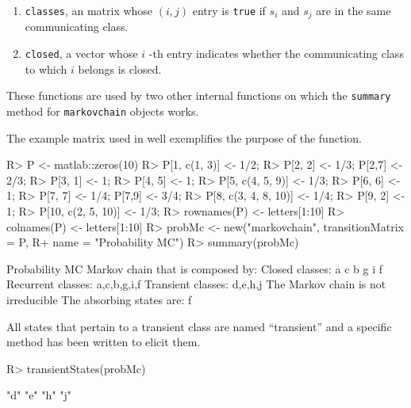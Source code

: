 \documentclass[
  nojss]{jss}
\providecommand{\tightlist}{%
  \setlength{\itemsep}{0pt}\setlength{\parskip}{0pt}}
\begin{document}
\begin{enumerate}
\def\labelenumi{\arabic{enumi}.}
\tightlist
\item
  \texttt{classes}, an matrix whose \((i, j)\) entry is \texttt{true} if \(s_i\) and \(s_j\) are in the same communicating class.
\item
  \texttt{closed}, a vector whose \(i\) -th entry indicates whether the communicating class to which \(i\) belongs is closed.
\end{enumerate}

These functions are used by two other internal functions on which the \texttt{summary} method for \texttt{markovchain} objects works.

The example matrix used in \cite{renaldoMatlab} well exemplifies the purpose of the function.

\begin{CodeChunk}

\begin{CodeInput}
R> P <- matlab::zeros(10)
R> P[1, c(1, 3)] <- 1/2;
R> P[2, 2] <- 1/3; P[2,7] <- 2/3;
R> P[3, 1] <- 1;
R> P[4, 5] <- 1;
R> P[5, c(4, 5, 9)] <- 1/3;
R> P[6, 6] <- 1;
R> P[7, 7] <- 1/4; P[7,9] <- 3/4;
R> P[8, c(3, 4, 8, 10)] <- 1/4;
R> P[9, 2] <- 1;
R> P[10, c(2, 5, 10)] <- 1/3;
R> rownames(P) <- letters[1:10] 
R> colnames(P) <- letters[1:10]
R> probMc <- new("markovchain", transitionMatrix = P, 
R+               name = "Probability MC")
R> summary(probMc)
\end{CodeInput}

\begin{CodeOutput}
Probability MC  Markov chain that is composed by: 
Closed classes: 
a c 
b g i 
f 
Recurrent classes: 
{a,c},{b,g,i},{f}
Transient classes: 
{d,e},{h},{j}
The Markov chain is not irreducible 
The absorbing states are: f
\end{CodeOutput}
\end{CodeChunk}

All states that pertain to a transient class are named ``transient'' and a
specific method has been written to elicit them.

\begin{CodeChunk}

\begin{CodeInput}
R> transientStates(probMc)
\end{CodeInput}

\begin{CodeOutput}
[1] "d" "e" "h" "j"
\end{CodeOutput}
\end{CodeChunk}
\end{document}
